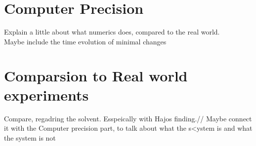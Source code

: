 \section{Computer Precision}
\label{sec:precision}
Explain a little about what numerics does, compared to the real world.\\
Maybe include the time evolution of minimal changes

\section{Comparsion to Real world experiments} 
\label{sec:comparison}
Compare, regadring the solvent. Esspeically with Hajos finding.//
Maybe connect it with the Computer precision part, to talk about what the s<ystem is and what the system is not
